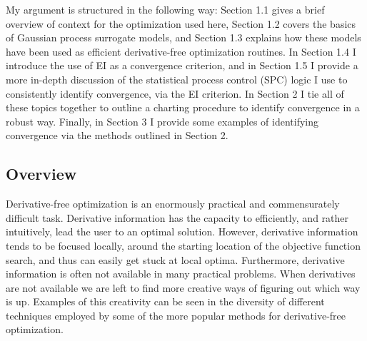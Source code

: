 \documentclass[12pt]{article}
\def \EIx {
	\mathbb{E}\left[~\text{I}(\underline{\bm{x}})~\right]
}
\begin{document}
	My argument is structured in the following way: Section 1.1 gives a brief overview of context for the optimization used here, Section 1.2 covers the basics of Gaussian process surrogate models, and Section 1.3 explains how these models have been used as efficient derivative-free optimization routines.
	In Section 1.4 I introduce the use of EI as a convergence criterion, and in Section 1.5 I provide a more in-depth discussion of the statistical process control (SPC) logic I use to consistently identify convergence, via the EI criterion.
	In Section 2 I tie all of these topics together to outline a charting procedure to identify convergence in a robust way.
	Finally, in Section 3 I provide some examples of identifying convergence via the methods outlined in Section 2. 
	
	\subsection{Overview}
	
	Derivative-free optimization is an enormously practical and commensurately difficult task.
	Derivative information has the capacity to efficiently, and rather intuitively, lead the user to an optimal solution. %
	However, derivative information tends to be focused locally, around the starting location of the objective function search, and thus can easily get stuck at local optima.
	Furthermore, derivative information is often not available in many practical problems.
	When derivatives are not available we are left to find more creative ways of figuring out which way is up.
	Examples of this creativity can be seen in the diversity of different techniques employed by some of the more popular methods for derivative-free optimization.
	
\end{document}
